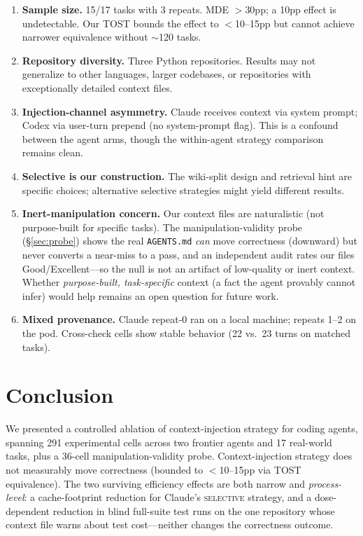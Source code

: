 \documentclass[11pt]{article}
\newcommand{\agentsmd}{\texttt{AGENTS.md}}
\newcommand{\selective}{\textsc{selective}}
\begin{document}
\begin{enumerate}
    \item \textbf{Sample size.} 15/17 tasks with 3 repeats. MDE $>$30pp; a 10pp effect is undetectable. Our TOST bounds the effect to $<$10--15pp but cannot achieve narrower equivalence without $\sim$120 tasks.
    \item \textbf{Repository diversity.} Three Python repositories. Results may not generalize to other languages, larger codebases, or repositories with exceptionally detailed context files.
    \item \textbf{Injection-channel asymmetry.} Claude receives context via system prompt; Codex via user-turn prepend (no system-prompt flag). This is a confound between the agent arms, though the within-agent strategy comparison remains clean.
    \item \textbf{Selective is our construction.} The wiki-split design and retrieval hint are specific choices; alternative selective strategies might yield different results.
    \item \textbf{Inert-manipulation concern.} Our context files are naturalistic (not purpose-built for specific tasks). The manipulation-validity probe (\S\ref{sec:probe}) shows the real \agentsmd{} \emph{can} move correctness (downward) but never converts a near-miss to a pass, and an independent audit rates our files Good/Excellent---so the null is not an artifact of low-quality or inert context. Whether \emph{purpose-built, task-specific} context (a fact the agent provably cannot infer) would help remains an open question for future work.
    \item \textbf{Mixed provenance.} Claude repeat-0 ran on a local machine; repeats 1--2 on the pod. Cross-check cells show stable behavior (22 vs.\ 23 turns on matched tasks).
\end{enumerate}

\section{Conclusion}

We presented a controlled ablation of context-injection strategy for coding agents, spanning 291 experimental cells across two frontier agents and 17 real-world tasks, plus a 36-cell manipulation-validity probe.
Context-injection strategy does not measurably move correctness (bounded to $<$10--15pp via TOST equivalence).
The two surviving efficiency effects are both narrow and \emph{process-level}: a cache-footprint reduction for Claude's \selective{} strategy, and a dose-dependent reduction in blind full-suite test runs on the one repository whose context file warns about test cost---neither changes the correctness outcome.
\end{document}
